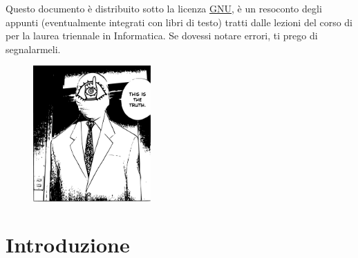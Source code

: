 \documentclass[10pt, letterpaper]{report}
\begin{document}
\newpage
\pagecolor{cartaRiciclata}%
Questo documento è distribuito sotto la licenza 
\color{blue}\href{https://www.gnu.org/licenses/fdl-1.3.txt}{GNU}\color{black},  
è un resoconto degli appunti (eventualmente integrati con libri di testo) tratti dalle lezioni del corso di \jobname
\hphantom{a}per la laurea 
triennale in Informatica. Se dovessi notare errori, ti prego di segnalarmeli.
\vfill
\begin{figure}[h!]
    \raggedright
    \includegraphics[width=0.4\textwidth,right ]{../../preamble/tomodachi.pdf} 
\end{figure}
\newpage %
\normalsize
\tableofcontents 
\newpage

\fancyhf{}
\fancyhead[L]{\nouppercase{\leftmark}}
\fancyfoot[C]{\thepage}



\chapter{Introduzione}
\end{document}
